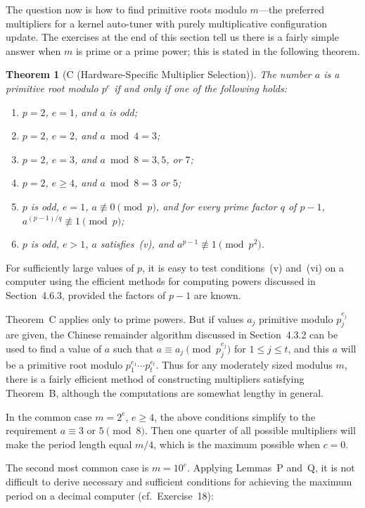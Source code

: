 \documentclass[12pt]{article}
\newtheorem{theorem}{Theorem}[section]
\begin{document}
The question now is how to find primitive roots modulo $m$---the preferred multipliers for a kernel auto-tuner with purely multiplicative configuration update. The exercises at the end of this section tell us there is a fairly simple answer when $m$ is prime or a prime power; this is stated in the following theorem.

\begin{theorem}[C (Hardware-Specific Multiplier Selection)]
The number $a$ is a primitive root modulo $p^e$ if and only if one of the following holds:
\begin{enumerate}
\item[i)] $p = 2$, $e = 1$, and $a$ is odd;
\item[ii)] $p = 2$, $e = 2$, and $a \bmod 4 = 3$;
\item[iii)] $p = 2$, $e = 3$, and $a \bmod 8 = 3, 5$, or $7$;
\item[iv)] $p = 2$, $e \geq 4$, and $a \bmod 8 = 3$ or $5$;
\item[v)] $p$ is odd, $e = 1$, $a \not\equiv 0 \pmod{p}$, and for every prime factor $q$ of $p - 1$, $a^{(p-1)/q} \not\equiv 1 \pmod{p}$;
\item[vi)] $p$ is odd, $e > 1$, $a$ satisfies~(v), and $a^{p-1} \not\equiv 1 \pmod{p^2}$.
\end{enumerate}
\end{theorem}

For sufficiently large values of $p$, it is easy to test conditions~(v) and~(vi) on a computer using the efficient methods for computing powers discussed in Section~4.6.3, provided the factors of $p - 1$ are known.

Theorem~C applies only to prime powers. But if values $a_j$ primitive modulo $p_j^{e_j}$ are given, the Chinese remainder algorithm discussed in Section~4.3.2 can be used to find a value of $a$ such that $a \equiv a_j \pmod{p_j^{e_j}}$ for $1 \leq j \leq t$, and this $a$ will be a primitive root modulo $p_1^{e_1} \cdots p_t^{e_t}$. Thus for any moderately sized modulus $m$, there is a fairly efficient method of constructing multipliers satisfying Theorem~B, although the computations are somewhat lengthy in general.

In the common case $m = 2^e$, $e \geq 4$, the above conditions simplify to the requirement $a \equiv 3$ or $5 \pmod{8}$. Then one quarter of all possible multipliers will make the period length equal $m/4$, which is the maximum possible when $c = 0$.

The second most common case is $m = 10^e$. Applying Lemmas~P and~Q, it is not difficult to derive necessary and sufficient conditions for achieving the maximum period on a decimal computer (cf.\ Exercise~18):
\end{document}
